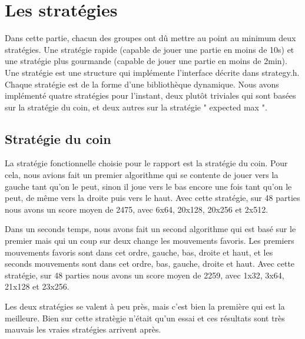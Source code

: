 \documentclass[12pt]{article}
\begin{document}
\newpage
\section{Les stratégies}
Dans cette partie, chacun des groupes ont dû mettre au point au minimum deux
stratégies. Une stratégie rapide (capable de jouer une partie en moins de
10s) et une stratégie plus gourmande (capable de jouer une partie en moins de
2min). Une stratégie est une structure qui implémente l’interface décrite
dans strategy.h. Chaque stratégie est de la forme d’une bibliothèque
dynamique. Nous avons implémenté quatre stratégies pour l'instant, deux
plutôt triviales qui sont basées sur la stratégie du coin, et deux autres sur
la stratégie " expected max ". 

\subsection{Stratégie du coin}
La stratégie fonctionnelle choisie pour le rapport est la stratégie du coin.
Pour cela, nous avions fait un premier algorithme qui se contente de jouer vers
la gauche tant qu'on le peut, sinon il joue vers le bas encore une fois tant
qu'on le peut, de même vers la droite puis vers le haut. Avec cette stratégie,
sur 48 parties nous avons un score moyen de 2475, avec 6x64, 20x128, 20x256 et
2x512.

Dans un seconds temps, nous avons fait un second algorithme qui est basé sur le
premier mais qui un coup sur deux change les mouvements favoris. Les premiers
mouvements favoris sont dans cet ordre, gauche, bas, droite et haut, et les
seconds mouvements sont dans cet ordre, bas, gauche, droite et haut. Avec cette
stratégie, sur 48 parties nous avons un score moyen de 2259, avec 1x32, 3x64,
21x128 et 23x256.

Les deux stratégies se valent à peu près, mais c'est bien la première qui est la
meilleure. Bien sur cette stratègie n'était qu'un essai et ces résultats sont
très mauvais les vraies stratégies arrivent après.
\end{document}
